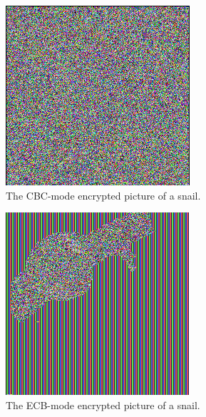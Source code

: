 \begin{figure}
    \centering
    \includegraphics[height=\textheight,width=\textwidth,keepaspectratio]
    {figures/snail_cbc.png}
    \caption{The CBC-mode encrypted picture of a snail.}\label{fig:snail_cbc}
\end{figure}

\begin{figure}
    \centering
    \includegraphics[height=\textheight,width=\textwidth,keepaspectratio]
    {figures/snail_ecb.png}
    \caption{The ECB-mode encrypted picture of a snail.}\label{fig:snail_ecb}
\end{figure}